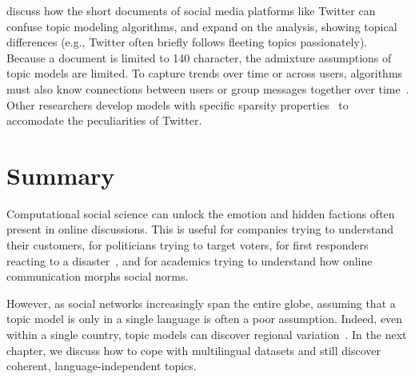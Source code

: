\citet{hong-10} discuss how the short documents of social media
platforms like Twitter can confuse topic modeling algorithms, and
\citet{zhao-11} expand on the analysis, showing topical differences
(e.g., Twitter often briefly follows fleeting topics passionately).
Because a document is limited to 140 character, the admixture
assumptions of topic models are limited.  To capture trends over time
or across users, algorithms must also know connections between users
or group messages together over time~\citep{mehrotra-13}.  Other
researchers develop models with specific sparsity
properties~\citep{lin-14} to accomodate the peculiarities of Twitter.

\section{Summary}
\label{sec:css-summary}

Computational social science can unlock the emotion and hidden
factions often present in online discussions.  This is useful for
companies trying to understand their customers, for politicians trying
to target voters, for first responders reacting to a
disaster~\citep{kireyev-09}, and for academics trying to understand
how online communication morphs social norms.

However, as social networks increasingly span the entire globe,
assuming that a topic model is only in a single language is often a
poor assumption.  Indeed, even within a single country, topic models
can discover regional variation~\citep{eisenstein-10}.  In the next
chapter, we discuss how to cope with multilingual datasets and still
discover coherent, language-independent topics.


